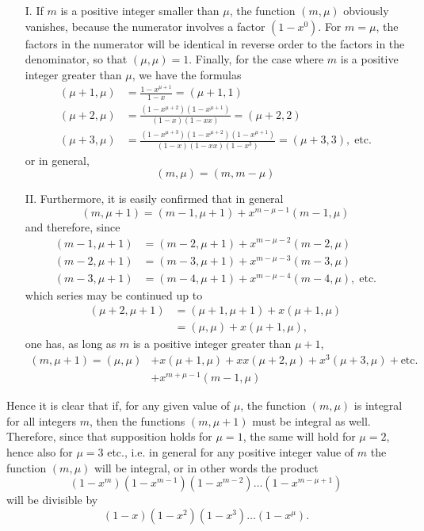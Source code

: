 \documentclass{book}
\theoremstyle{plain}
\theoremstyle{remark}
\begin{document}
\begin{enumerate}
\item[I.] If $m$ is a positive integer smaller than $\mu$, the function $(m, \mu)$ obviously vanishes, because the numerator involves a factor $(1-x^0)$.  For $m = \mu$, the factors in the numerator will be identical in reverse order to the factors in the denominator, so that $(\mu,\mu) = 1$.   Finally, for the case where $m$ is a positive integer greater than $\mu$, we have the formulas 
\begin{align*} (\mu+1,\mu) &= \frac{1-x^{\mu+1}}{1-x} = (\mu+1,1) \\
(\mu+2,\mu) &= \frac{(1-x^{\mu+2})(1-x^{\mu+1})}{(1-x)(1-xx)} = (\mu+2,2) \\
(\mu+3,\mu) &= \frac{(1-x^{\mu+3})(1-x^{\mu+2})(1-x^{\mu+1})}{(1-x)(1-xx)(1-x^3)} = (\mu+3,3) , \; \textrm{etc.} \end{align*}
or in general,
\[ (m,\mu) = (m,m-\mu) \]
\item[II.] Furthermore, it is easily confirmed that in general
\[ (m,\mu+1) = (m-1,\mu+1) + x^{m-\mu-1} (m-1,\mu) \]
and therefore, since
\begin{align*} (m-1,\mu+1) &= (m-2,\mu+1) + x^{m-\mu-2} (m-2,\mu) \\
(m-2,\mu+1) &= (m-3,\mu+1) + x^{m-\mu-3} (m-3,\mu) \\
(m-3,\mu+1) &= (m-4,\mu+1) + x^{m-\mu-4} (m-4,\mu) , \; \mathrm{etc.}\end{align*}
which series may be continued up to
\begin{align*} (\mu+2,\mu+1) &= (\mu+1,\mu+1) + x(\mu+1,\mu) \\
&= (\mu,\mu) + x (\mu+1,\mu), \end{align*} 
one has, as long as $m$ is a positive integer greater than $\mu+1$, 
\begin{align*} (m,\mu+1) = (\mu,\mu) &+ x(\mu+1,\mu)+xx(\mu+2,\mu) +x^3(\mu+3,\mu) + \textrm{etc. }\\
&+ x^{m+\mu-1} (m-1,\mu) \end{align*}
\end{enumerate}
Hence it is clear that if, for any given value of $\mu$, the function $(m,\mu)$ is integral for all integers $m$, then the functions $(m,\mu+1)$ must be integral as well.  Therefore, since that supposition holds for $\mu =1$, the same will hold for $\mu =2$, hence also for $\mu=3$ etc., i.e. in general for any positive integer value of $m$ the function $(m,\mu)$ will be integral, or in other words the product
\[ (1-x^m)(1-x^{m-1})(1-x^{m-2})\dots (1-x^{m-\mu+1}) \]
will be divisible by
\[ (1-x)(1-x^2)(1-x^3)\dots (1-x^{\mu}). \]
\end{document}
